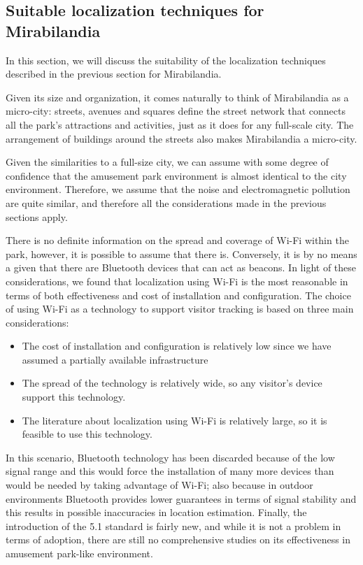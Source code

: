 \subsection{Suitable localization techniques for Mirabilandia}
In this section, we will discuss the suitability of the localization techniques described in the previous section for Mirabilandia.

Given its size and organization, it comes naturally to think of Mirabilandia as a micro-city: streets, avenues and squares define the street network
that connects all the park's attractions and activities, just as it does for any full-scale city. The arrangement of buildings around
the streets also makes Mirabilandia a micro-city.

Given the similarities to a full-size city, we can assume with some degree of confidence that the amusement park environment is almost identical to
the city environment.
Therefore, we assume that the noise and electromagnetic pollution are quite similar, and therefore all the considerations made in the previous
sections apply.

There is no definite information on the spread and coverage of Wi-Fi within the park, however, it is possible to assume that there is.
Conversely, it is by no means a given that there are Bluetooth devices that can act as beacons.
In light of these considerations, we found that localization using Wi-Fi is the most reasonable in terms of both effectiveness and cost of
installation and configuration. The choice of using Wi-Fi as a technology to support visitor tracking is based on three main considerations:

\begin{itemize}
	\item The cost of installation and configuration is relatively low since we have assumed a partially available infrastructure
	\item The spread of the technology is relatively wide, so any visitor's device support this technology.
	\item The literature about localization using Wi-Fi is relatively large, so it is feasible to use this technology.
\end{itemize}

In this scenario, Bluetooth technology has been discarded because of the low signal range and this would force the installation of many more devices
than would be needed by taking advantage of Wi-Fi; also because in outdoor environments Bluetooth provides lower guarantees in terms of signal
stability and this results in possible inaccuracies in location estimation.
Finally, the introduction of the 5.1 standard is fairly new, and while it is not a problem in terms of adoption, there are still no comprehensive
studies on its effectiveness in amusement park-like environment.

